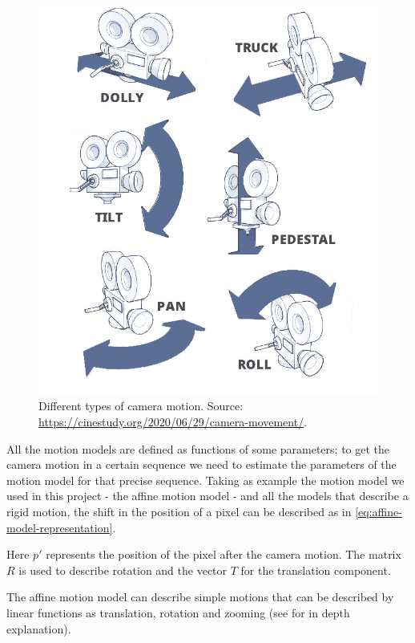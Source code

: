 \begin{figure}
    \centering
    \includegraphics[width=.9\linewidth]{../assets/images/camera-movement.png}
    \caption{Different types of camera motion. Source: \url{https://cinestudy.org/2020/06/29/camera-movement/}.}
    \label{fig:camera-motion}
\end{figure}

All the motion models are defined as functions of some parameters; to get the camera motion in a certain sequence we need to estimate the parameters of the motion model for that precise sequence. Taking as example the motion model we used in this project - the affine motion model - and all the models that describe a rigid motion, the shift in the position of a pixel can be described as in \cref{eq:affine-model-representation}.



Here $p'$ represents the position of the pixel after the camera motion. The matrix $R$ is used to describe rotation and the vector $T$ for the translation component.

The affine motion model can describe simple motions that can be described by linear functions as translation, rotation and zooming (see \cite{Ren20} for in depth explanation).

